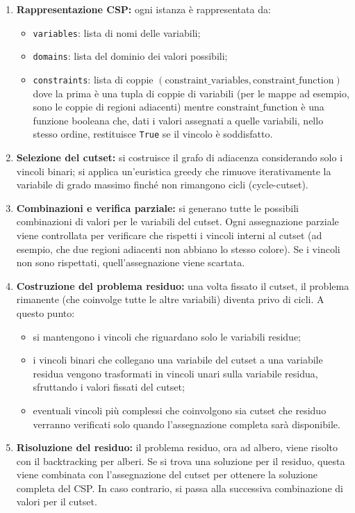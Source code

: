 \documentclass[a4paper,11pt]{article}
\begin{document}
\begin{enumerate}
  \item \textbf{Rappresentazione CSP:} ogni istanza è rappresentata da:
   \begin{itemize}
      \item \texttt{variables}: lista di nomi delle variabili;
      \item \texttt{domains}: lista del dominio dei valori possibili;
      \item \texttt{constraints}: lista di coppie \((\text{constraint\_variables}, \text{constraint\_function})\) dove la prima è una tupla di coppie di variabili (per le mappe ad esempio, sono le coppie di regioni adiacenti) mentre \(\text{constraint\_function}\) è una funzione booleana che, dati i valori assegnati a quelle variabili, nello stesso ordine, restituisce \texttt{True} se il vincolo è soddisfatto.
   \end{itemize}
  \item \textbf{Selezione del cutset:} si costruisce il grafo di adiacenza considerando solo i vincoli binari; si applica un'euristica greedy che rimuove iterativamente la variabile di grado massimo finché non rimangono cicli (cycle-cutset).
  \item \textbf{Combinazioni e verifica parziale:} si generano tutte le possibili combinazioni di valori per le variabili del cutset. Ogni assegnazione parziale viene controllata per verificare che rispetti i vincoli interni al cutset (ad esempio, che due regioni adiacenti non abbiano lo stesso colore). Se i vincoli non sono rispettati, quell’assegnazione viene scartata.
  \item \textbf{Costruzione del problema residuo:} una volta fissato il cutset, il problema rimanente (che coinvolge tutte le altre variabili) diventa privo di cicli. A questo punto:
\begin{itemize}
    \item si mantengono i vincoli che riguardano solo le variabili residue;
    \item i vincoli binari che collegano una variabile del cutset a una variabile residua vengono trasformati in vincoli unari sulla variabile residua, sfruttando i valori fissati del cutset;
    \item eventuali vincoli più complessi che coinvolgono sia cutset che residuo verranno verificati solo quando l’assegnazione completa sarà disponibile.
\end{itemize}

  \item \textbf{Risoluzione del residuo:} il problema residuo, ora ad albero, viene risolto con il backtracking per alberi. Se si trova una soluzione per il residuo, questa viene combinata con l’assegnazione del cutset per ottenere la soluzione completa del CSP. In caso contrario, si passa alla successiva combinazione di valori per il cutset.
  
\end{enumerate}
\end{document}
